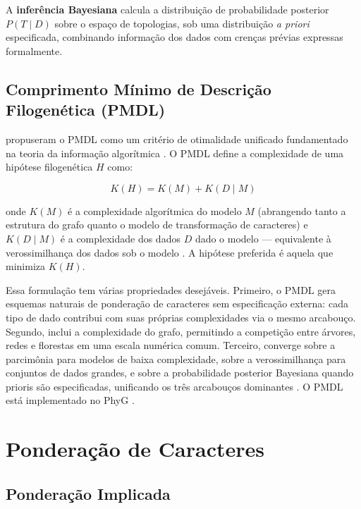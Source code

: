 A \textbf{inferência Bayesiana} calcula a distribuição de probabilidade posterior $P(T \mid D)$ sobre o espaço de topologias, sob uma distribuição \textit{a priori} especificada, combinando informação dos dados com crenças prévias expressas formalmente.

\subsection{Comprimento Mínimo de Descrição Filogenética (PMDL)}

\textcite{wheelervaron2025} propuseram o PMDL como um critério de otimalidade unificado fundamentado na teoria da informação algorítmica \parencite{kolmogorov1968,livitanyi1997}. O PMDL define a complexidade de uma hipótese filogenética $H$ como:

\begin{equation}
    K(H) = K(M) + K(D \mid M)
\end{equation}

onde $K(M)$ é a complexidade algorítmica do modelo $M$ (abrangendo tanto a estrutura do grafo quanto o modelo de transformação de caracteres) e $K(D \mid M)$ é a complexidade dos dados $D$ dado o modelo --- equivalente à verossimilhança dos dados sob o modelo \parencite{wheelervaron2025}. A hipótese preferida é aquela que minimiza $K(H)$.

Essa formulação tem várias propriedades desejáveis. Primeiro, o PMDL gera esquemas naturais de ponderação de caracteres sem especificação externa: cada tipo de dado contribui com suas próprias complexidades via o mesmo arcabouço. Segundo, inclui a complexidade do grafo, permitindo a competição entre árvores, redes e florestas em uma escala numérica comum. Terceiro, converge sobre a parcimônia para modelos de baixa complexidade, sobre a verossimilhança para conjuntos de dados grandes, e sobre a probabilidade posterior Bayesiana quando prioris são especificadas, unificando os três arcabouços dominantes \parencite{wheelervaron2025}. O PMDL está implementado no PhyG \parencite{wheeleretal2024}.

\section{Ponderação de Caracteres}
\label{sec:pesos}

\subsection{Ponderação Implicada}

